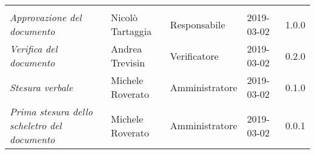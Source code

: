 \newpage 
\section*{}
\begin{table}[H]
	\centering
	\begin{tabular}{p{4cm}|C{3cm}|C{3cm}|R{2.5cm}|R{2cm}}
		
		 & & & & \\
		
		
		\emph{Approvazione del documento} & Nicolò Tartaggia & Responsabile & 2019-03-02 & 1.0.0 \\
		\hline
		
		\emph{Verifica del documento} & Andrea Trevisin & Verificatore & 2019-03-02 & 0.2.0 \\
		\hline
		
		\emph{Stesura verbale} & Michele Roverato & Amministratore & 2019-03-02 & 0.1.0 \\
		\hline
		
		\emph{Prima stesura dello scheletro del documento} & Michele Roverato & Amministratore & 2019-03-02 & 0.0.1 \\
		
	\end{tabular}
	
\end{table}


\clearpage